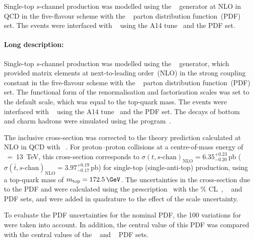 Single-top $s$-channel production was modelled using the \POWHEGBOX[v2]~\cite{Alioli:2009je,Nason:2004rx,Frixione:2007vw,Alioli:2010xd}
generator at NLO in QCD in the five-flavour scheme with the \NNPDF[3.0nlo]~\cite{Ball:2014uwa} parton distribution function~(PDF) set.
The events were interfaced with \PYTHIA[8.230]~\cite{Sjostrand:2014zea} using the A14 tune~\cite{ATL-PHYS-PUB-2014-021} and the
\NNPDF[2.3lo] PDF set.




\paragraph{Long description:}

Single-top $s$-channel production was modelled using the \POWHEGBOX[v2]~\cite{Alioli:2009je,Nason:2004rx,Frixione:2007vw,Alioli:2010xd}
generator, which provided matrix elements at next-to-leading order~(NLO) in the strong coupling constant \alphas in the 
five-flavour scheme with the \NNPDF[3.0nlo]~\cite{Ball:2014uwa} parton distribution function~(PDF) set.
The functional form of the renormalisation and factorisation scales was set to the default scale, which was equal to the top-quark mass.
The events were interfaced with \PYTHIA[8.230]~\cite{Sjostrand:2014zea} using the A14 tune~\cite{ATL-PHYS-PUB-2014-021} and the
\NNPDF[2.3lo] PDF set.
The decays of bottom and charm hadrons were simulated using the \EVTGEN[1.6.0] program~\cite{Lange:2001uf}.

The inclusive cross-section was corrected to the theory prediction calculated at NLO in QCD with 
\HATHOR[2.1]~\cite{Aliev:2010zk,Kant:2014oha}.
For proton--proton collisions at a centre-of-mass energy of \rts~=~\SI{13}{\TeV}, this cross-section corresponds to
$\sigma(t,s\text{-chan})_\text{NLO}= 6.35^{+0.23}_{-0.20}$\,pb ($\sigma(\bar{t},s\text{-chan})_\text{NLO}=3.97^{+0.19}_{-0.17}$\,pb)
for single-top (single-anti-top) production, using a top-quark mass of $\mtop = 172.5\,\GeV$.
The uncertainties in the cross-section due to the PDF and \alphas were calculated using the \PDFforLHC prescription~\cite{Butterworth:2015oua}
with the \% CL~\cite{Martin:2009iq,Martin:2009bu}, \CT[10nlo]~\cite{Lai:2010vv} and \NNPDF[2.3nlo]~\cite{Ball:2012cx} PDF sets,
and were added in quadrature to the effect of the scale uncertainty.



To evaluate the PDF uncertainties for the nominal PDF, the 100 variations for \NNPDF[3.0nlo] were taken into account. 
In addition, the central value of this PDF was compared with the central values of the 
\CT[14nnlo]~\cite{Dulat:2015mca} and \MMHT[nnlo]~\cite{Harland-Lang:2014zoa} PDF sets.


